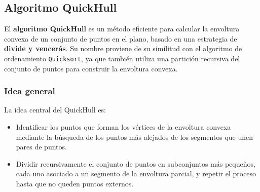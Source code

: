 \documentclass[12pt]{book}
\theoremstyle{definition}
\theoremstyle{plain}
\theoremstyle{remark}
\begin{document}








\subsection{Algoritmo QuickHull} %
\label{subsec:quickhull}

El \textbf{algoritmo QuickHull} %
es un método eficiente para calcular la envoltura convexa de un conjunto de puntos en el plano, basado en una estrategia de \textbf{divide y vencerás}. Su nombre proviene de su similitud con el algoritmo de ordenamiento \texttt{Quicksort}, ya que también utiliza una partición recursiva del conjunto de puntos para construir la envoltura convexa.

\subsubsection{Idea general}
La idea central del QuickHull es:
\begin{itemize}
    \item Identificar los puntos que forman los vértices de la envoltura convexa mediante la búsqueda de los puntos más alejados de los segmentos que unen pares de puntos.
    \item Dividir recursivamente el conjunto de puntos en subconjuntos más pequeños, cada uno asociado a un segmento de la envoltura parcial, y repetir el proceso hasta que no queden puntos externos.
\end{itemize}
\end{document}
